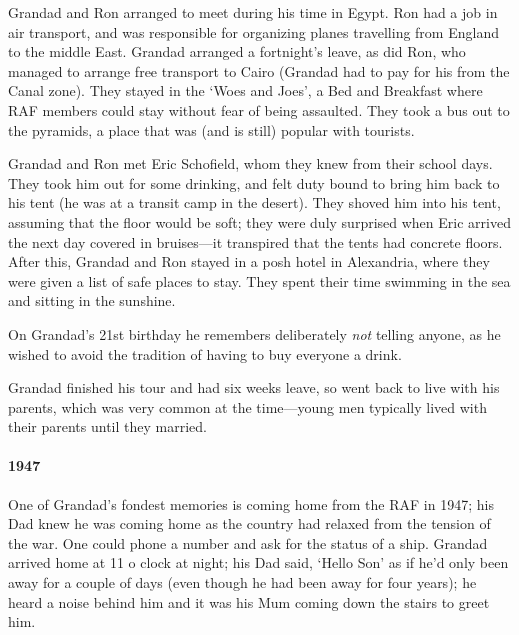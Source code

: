 Grandad and Ron arranged to meet during his time in Egypt. Ron had a job
in air transport, and was responsible for organizing planes travelling from England
to the middle East. Grandad arranged a fortnight's leave, as did Ron, who
managed to arrange free transport to Cairo (Grandad had to pay for his from
the Canal zone). They stayed in the `Woes and Joes', a Bed and Breakfast where RAF members
could stay without fear of being assaulted. They took a bus out to the pyramids, a place
that was (and is still) popular with tourists.

Grandad and Ron met Eric Schofield, whom they knew from their school days. They
took him out for some drinking, and felt duty bound to bring him back to his tent (he was
at a transit camp in the desert). They shoved him into his tent, assuming that
the floor would be soft; they were duly surprised when Eric arrived the next day
covered in bruises---it transpired that the tents had concrete floors. After this,
Grandad and Ron stayed in a posh hotel in Alexandria, where they were given
a list of safe places to stay. They spent their time swimming in the sea
and sitting in the sunshine.

\begin{figure}
	\centering
\end{figure}
On Grandad's 21st birthday he remembers deliberately \emph{not} telling anyone, as
he wished to avoid the tradition of having to buy everyone a drink.

Grandad finished his tour and had six weeks leave, so went back to live with his parents, which was
very common at the time---young men typically lived with their parents until they married.

\paragraph{1947} One of Grandad's fondest memories is coming home from the RAF in 1947; his Dad knew
he was coming home  as the country had relaxed from the tension of the war.
One could phone a number and ask for the status of a ship. Grandad arrived home at
11 o clock at night; his Dad said, `Hello Son' as if he'd only been away for
a couple of days (even though he had been away for four years); he heard a noise
behind him and it was his Mum coming down the stairs to greet him.

